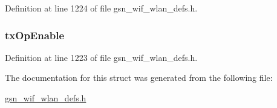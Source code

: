 Definition at line 1224 of file gsn\_\-wif\_\-wlan\_\-defs.h.

\hypertarget{a00396_a14581b53a42859038066f83224be00b7}{
\subsubsection[{txOpEnable}]{ {\bf txOpEnable}}}
\label{a00396_a14581b53a42859038066f83224be00b7}


Definition at line 1223 of file gsn\_\-wif\_\-wlan\_\-defs.h.



The documentation for this struct was generated from the following file:\begin{DoxyCompactItemize}
\item 
\hyperlink{a00613}{gsn\_\-wif\_\-wlan\_\-defs.h}\end{DoxyCompactItemize}
